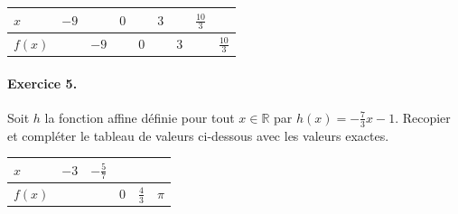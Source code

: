 \documentclass[11pt]{article}
\begin{document}
\begin{center}
  \renewcommand{\arraystretch}{2}
  \begin{tabularx}{\textwidth}{|>{\centering}X|>{\centering}X|>{\centering}X|
    >{\centering}X|>{\centering}X|>{\centering}X|>{\centering}X|>{\centering}X|
    >{\centering\arraybackslash}X|}
    \hline
    $x$ & $-9$ & & $0$ & & $3$ & & $\frac{10}{3}$ & \\
    \hline
    $f(x)$ & & $-9$ & & $0$ & & $3$ & & $\frac{10}{3}$ \\
    \hline
  \end{tabularx}
\end{center}

\paragraph{Exercice 5.}
Soit $h$ la fonction affine définie pour tout $x\in\mathbb{R}$ par
$h(x)=-\frac{7}{3}x-1$. Recopier et compléter le tableau de valeurs ci-dessous
avec les valeurs exactes.
\begin{center}
\renewcommand{\arraystretch}{2}
\begin{tabularx}{\textwidth}{|Y|Y|Y|Y|Y|Y|}
 \hline
 $x$ & $-3$ & $-\frac{5}{7}$ & & & \\
 \hline
 $f(x)$ & & & $0$ & $\frac{4}{3}$ & $\pi$ \\
 \hline
\end{tabularx}
\end{center}
\end{document}
